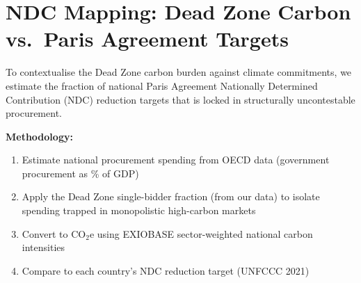 \documentclass[11pt]{article}
\begin{document}
\section{NDC Mapping: Dead Zone Carbon vs.\ Paris Agreement Targets}
\label{sec:ndc_mapping}

To contextualise the Dead Zone carbon burden against climate commitments, we estimate the fraction of national Paris Agreement Nationally Determined Contribution (NDC) reduction targets that is locked in structurally uncontestable procurement.

\textbf{Methodology:}
\begin{enumerate}
    \item Estimate national procurement spending from OECD data (government procurement as \% of GDP)
    \item Apply the Dead Zone single-bidder fraction (from our data) to isolate spending trapped in monopolistic high-carbon markets
    \item Convert to CO$_2$e using EXIOBASE sector-weighted national carbon intensities
    \item Compare to each country's NDC reduction target (UNFCCC 2021)
\end{enumerate}
\end{document}
